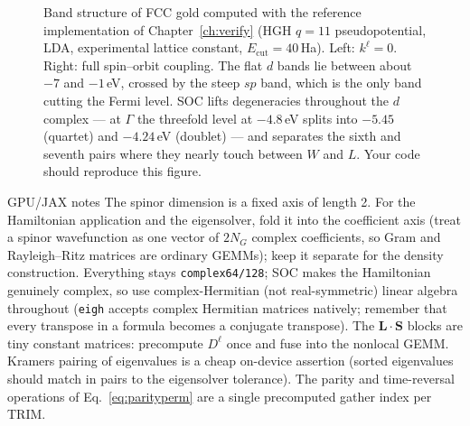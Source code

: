 \begin{figure}[tbp]
\centering
{}
\hfill
{}
\caption{Band structure of FCC gold computed with the reference
implementation of Chapter~\ref{ch:verify} (HGH $q{=}11$ pseudopotential,
LDA, experimental lattice constant, $E_{\mathrm{cut}}=40$\,Ha). Left:
$k^\ell = 0$. Right: full spin--orbit coupling. The flat $d$ bands lie
between about $-7$ and $-1$\,eV, crossed by the steep $sp$ band, which is the
only band cutting the Fermi level. SOC lifts degeneracies throughout the
$d$ complex --- at $\Gamma$ the threefold level at $-4.8$\,eV splits into
$-5.45$ (quartet) and $-4.24$\,eV (doublet) --- and separates the sixth
and seventh pairs where they nearly touch between $W$ and $L$. Your code
should reproduce this figure.}
\label{fig:bands}
\end{figure}

\begin{gpubox}{GPU/JAX notes}
The spinor dimension is a fixed axis of length 2. For the Hamiltonian
application and the eigensolver, fold it into the coefficient axis (treat a
spinor wavefunction as one vector of $2N_G$ complex coefficients, so Gram
and Rayleigh--Ritz matrices are ordinary GEMMs); keep it separate for the
density construction. Everything stays
\texttt{complex64/128}; SOC makes the Hamiltonian genuinely complex, so use
complex-Hermitian (not real-symmetric) linear algebra throughout
(\texttt{eigh} accepts complex Hermitian matrices
natively; remember that every transpose in a formula becomes a conjugate
transpose). The $\mathbf L\cdot\mathbf S$ blocks are tiny constant matrices:
precompute $D^{\ell}$ once and fuse into the nonlocal GEMM. Kramers pairing
of eigenvalues is a cheap on-device assertion (sorted eigenvalues should
match in pairs to the eigensolver tolerance). The parity and time-reversal
operations of Eq.~\eqref{eq:parityperm} are a single precomputed gather
index per TRIM.
\end{gpubox}
